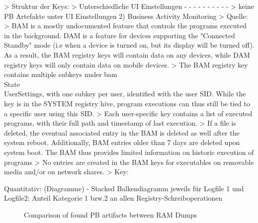 		> Struktur der Keys: %
		> Unterschiedliche UI Einstellungen
			- %
			- %
			- %
			- %
			- %
			- %
			- %
			- %
			- %
			- %
		> keine PB Artefakte unter UI Einstellungen	
	2) Business Activity Monitoring %
		> Quelle: %
		> BAM is a mostly undocumented feature that controls the programs executed in the background. DAM is a feature for devices supporting the "Connected Standby" mode (i.e when a device is turned on, but its display will be turned off). As a result, the BAM registry keys will contain data on any devices, while DAM registry keys will only contain data on mobile devices.
		> The BAM registry key contains multiple subkeys under bam\\State\\UserSettings, with one subkey per user, identified with the user SID. While the key is in the SYSTEM registry hive, program executions can thus still be tied to a specific user using this SID.
		> Each user-specific key contains a list of executed programs, with their full path and timestamp of last execution.
		> If a file is deleted, the eventual associated entry in the BAM is deleted as well after the system reboot. Additionally, BAM entries older than 7 days are deleted upon system boot. The BAM thus provides limited information on historic execution of programs
		> No entries are created in the BAM keys for executables on removable media and/or on network shares.
		> Key: %

Quantitativ: (Diagramme)
	- Stacked Balkendiagramm jeweils für Logfile 1 und Logfile2: Anteil Kategorie 1 bzw.2 an allen Registry-Schreiboperationen
	\begin{figure}[h!]
		\centerline{}
		\label{chart:final-criteria}  
		\caption{Comparison of found PB artifacts between RAM Dumps}
	\end{figure}
	
